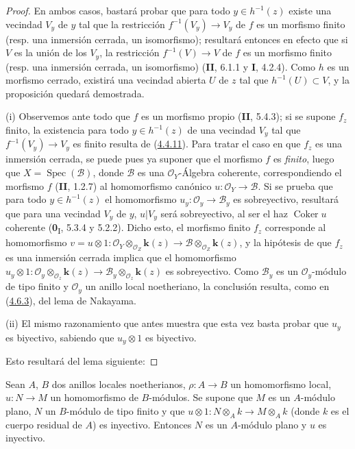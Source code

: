 \begin{proof}
En ambos casos, bastará probar que para todo $y\in h^{-1}(z)$
existe una vecindad $V_y$ de $y$ tal que la restricción
$f^{-1}(V_y)\to V_y$ de $f$ es un morfismo finito (resp. una inmersión
cerrada, un isomorfismo); resultará entonces en efecto que si $V$ es la
unión de los $V_y$, la restricción $f^{-1}(V)\to V$ de $f$ es un morfismo
finito (resp. una inmersión cerrada, un isomorfismo) (\textbf{II}, 6.1.1 y \textbf{I}, 4.2.4).
Como $h$ es un morfismo cerrado, existirá una vecindad abierta $U$ de $z$
tal que $h^{-1}(U)\subset V$, y la proposición quedará demostrada.

\noindent (i) Observemos ante todo que $f$ es un morfismo propio
(\textbf{II}, 5.4.3); si se
supone $f_z$ finito, la existencia para todo
$y\in h^{-1}(z)$ de una vecindad $V_y$ tal que $f^{-1}(V_y)\to V_y$ es finito
resulta de (\hyperref[III.4.4.11-fr]{4.4.11}).
Para tratar el caso en que $f_z$ es una inmersión cerrada, se puede pues ya
suponer que el morfismo $f$ es \emph{finito}, luego que
$X=\operatorname{Spec}(\mathcal B)$, donde $\mathcal B$ es una
$\mathcal O_Y$-Álgebra coherente, correspondiendo el morfismo $f$ (\textbf{II}, 1.2.7)
al homomorfismo canónico $u:\mathcal O_Y\to\mathcal B$. Si se prueba
que para todo $y\in h^{-1}(z)$ el homomorfismo
$u_y:\mathcal O_y\to\mathcal B_y$ es sobreyectivo, resultará que para una
vecindad $V_y$ de $y$, $u|V_y$ será sobreyectivo, al ser el haz
$\operatorname{Coker}u$ coherente (\textbf{0}\textsubscript{I}, 5.3.4 y 5.2.2).
Dicho esto, el morfismo finito $f_z$ corresponde al homomorfismo
$v=u\otimes1:
\mathcal O_Y\otimes_{\mathcal O_Z}\boldsymbol{k}(z)
\longrightarrow
\mathcal B\otimes_{\mathcal O_Z}\boldsymbol{k}(z)$,
y la hipótesis de que $f_z$ es una inmersión cerrada implica que
el homomorfismo
$u_y\otimes1:
\mathcal O_y\otimes_{\mathcal O_z}\boldsymbol{k}(z)
\longrightarrow
\mathcal B_y\otimes_{\mathcal O_z}\boldsymbol{k}(z)$
es sobreyectivo. Como $\mathcal B_y$ es un $\mathcal O_y$-módulo de tipo
finito y $\mathcal O_y$ un anillo local noetheriano, la conclusión resulta,
como en (\hyperref[III.4.6.3-fr]{4.6.3}), del lema de Nakayama.

\noindent (ii) El mismo razonamiento que antes muestra que
esta vez basta probar que $u_y$ es biyectivo, sabiendo que
$u_y\otimes1$ es biyectivo.

Esto resultará del lema siguiente:
\end{proof}

\begin{lemma}[4.6.7.1]
\label{III.4.6.7.1-fr}
Sean $A$, $B$ dos anillos locales noetherianos,
$\rho:A\to B$ un homomorfismo local, $u:N\to M$ un homomorfismo de
$B$-módulos. Se supone que $M$ es un $A$-módulo plano, $N$ un $B$-módulo
de tipo finito y que
$u\otimes1:N\otimes_Ak\longrightarrow M\otimes_Ak$
(donde $k$ es el cuerpo residual de $A$) es inyectivo. Entonces $N$ es un
$A$-módulo plano y $u$ es inyectivo.
\end{lemma}

